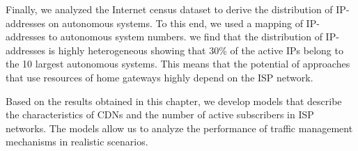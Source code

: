 Finally, we analyzed the Internet census dataset to derive the distribution of IP-addresses on autonomous systems.
To this end, we used a mapping of IP-addresses to autonomous system numbers.
we find that the distribution of IP-addresses is highly heterogeneous showing that 30\% of the active IPs belong to the 10 largest autonomous systems.
This means that the potential of approaches that use resources of home gateways highly depend on the ISP network.

Based on the results obtained in this chapter, we develop models that describe the characteristics of CDNs and the number of active subscribers in ISP networks.
The models allow us to analyze the performance of traffic management mechanisms in realistic scenarios.


